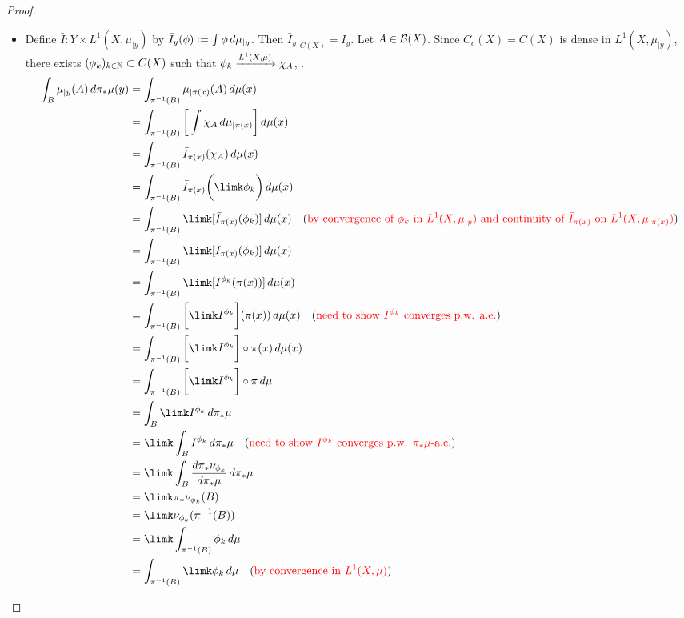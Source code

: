 \documentclass{book}
\begin{document}
\begin{proof}
\begin{itemize}
		\item {} Define $\bar{I}:Y \times L^1(X, \mu_{|y})$ by $\bar{I}_y(\phi) \vcentcolon= \int \phi \, d \mu_{|y}$. Then $\bar{I}_y|_{C(X)} = I_y$. Let $A \in \mathcal{B}(X)$. Since $C_c(X) = C(X)$ is dense in $L^1(X, \mu_{|y})$, there exists $(\phi_k)_{k \in \mathbb{N}} \subset C(X)$ such that $\phi_k \xrightarrow{L^1(X, \mu)} \chi_A$, . 
		\begin{align*}
			\int_B \mu_{|y}(A) \, d \pi_* \mu(y) 
			& = \int_{\pi^{-1}(B)} \mu_{|\pi(x)}(A) \dmu(x) \\
			& = \int_{\pi^{-1}(B)} \bigg[ \int \chi_A \dmu_{|\pi(x)} \bigg] \dmu(x) \\
			& = \int_{\pi^{-1}(B)} \bar{I}_{\pi(x)}(\chi_A)  \dmu(x) \\
			& = \int_{\pi^{-1}(B)} \bar{I}_{\pi(x)} \bigg(\limk \phi_k \bigg) \dmu(x) \\
			& = \int_{\pi^{-1}(B)} \limk [\bar{I}_{\pi(x)} ( \phi_k )] \dmu(x) \quad \text{(\tcr{by convergence of $\phi_k$ in $L^1(X, \mu_{|y})$ and continuity of $\bar{I}_{\pi(x)}$ on $L^1(X, \mu_{|\pi(x)})$})} \\
			& = \int_{\pi^{-1}(B)} \limk [I_{\pi(x)} ( \phi_k )] \dmu(x) \\
			& = \int_{\pi^{-1}(B)} \limk [I^{\phi_k}(\pi(x))] \dmu(x) \\
			& = \int_{\pi^{-1}(B)} \bigg[ \limk I^{\phi_k} \bigg] (\pi(x)) \dmu(x) \quad \text{(\tcr{need to show $I^{\phi_k}$ converges p.w. a.e.})} \\
			& = \int_{\pi^{-1}(B)} \bigg[ \limk I^{\phi_k} \bigg] \circ \pi(x) \dmu(x) \\
			& = \int_{\pi^{-1}(B)} \bigg[ \limk I^{\phi_k} \bigg] \circ \pi \dmu \\
			& = \int_B \limk I^{\phi_k} \, d \pi_* \mu \\
			& = \limk \int_B I^{\phi_k} \, d \pi_* \mu \quad \text{(\tcr{need to show $I^{\phi_k}$ converges p.w. $\pi_* \mu$-a.e.})} \\
			& = \limk \int_B \frac{d \pi_*\nu_{\phi_k}}{d \pi_* \mu} \, d \pi_* \mu \\
			& = \limk \pi_*\nu_{\phi_k}(B) \\
			& = \limk \nu_{\phi_k}(\pi^{-1}(B)) \\
			& = \limk \int_{\pi^{-1}(B)} \phi_k \dmu \\
			& = \int_{\pi^{-1}(B)} \limk \phi_k \dmu \quad \text{(\tcr{by convergence in $L^1(X, \mu)$})} \\ 

\end{align*}
\end{itemize}
\end{proof}
\end{document}
